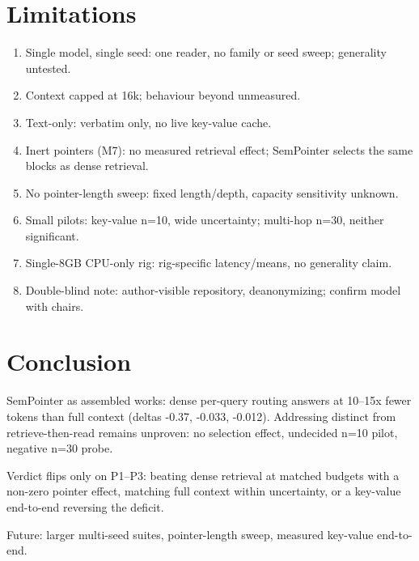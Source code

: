\section{Limitations}
\label{sec:c-close-limitations}
\begin{enumerate}
\item Single model, single seed: one reader, no family or seed sweep; generality untested.
\item Context capped at 16k; behaviour beyond unmeasured.
\item Text-only: verbatim only, no live key-value cache.
\item Inert pointers (M7): no measured retrieval effect; SemPointer selects the same blocks as dense retrieval.
\item No pointer-length sweep: fixed length/depth, capacity sensitivity unknown.
\item Small pilots: key-value n=10, wide uncertainty; multi-hop n=30, neither significant.
\item Single-8GB CPU-only rig: rig-specific latency/means, no generality claim.
\item Double-blind note: author-visible repository, deanonymizing; confirm model with chairs.
\end{enumerate}

\section{Conclusion}
\label{sec:c-close-conclusion}
SemPointer as assembled works: dense per-query routing answers at 10--15x fewer tokens than full context (deltas -0.37, -0.033, -0.012). Addressing distinct from retrieve-then-read remains unproven: no selection effect, undecided n=10 pilot, negative n=30 probe.

Verdict flips only on P1--P3: beating dense retrieval at matched budgets with a non-zero pointer effect, matching full context within uncertainty, or a key-value end-to-end reversing the deficit.

Future: larger multi-seed suites, pointer-length sweep, measured key-value end-to-end.
